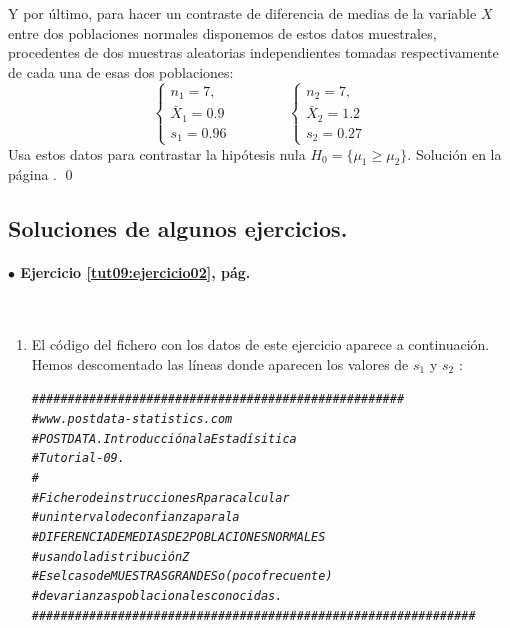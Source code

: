 \documentclass[10pt,a4paper]{article}\usepackage[]{graphicx}\usepackage[]{color}
\makeatletter
\newcommand{\hlcom}[1]{\textcolor[rgb]{0.678,0.584,0.686}{\textit{#1}}}%
\newenvironment{kframe}{%
 \def\at@end@of@kframe{}%
 \ifinner\ifhmode%
  \def\at@end@of@kframe{\end{minipage}}%
  \begin{minipage}{\columnwidth}%
 \fi\fi%
 \def\FrameCommand##1{\hskip\@totalleftmargin \hskip-\fboxsep
 \colorbox{shadecolor}{##1}\hskip-\fboxsep
     \hskip-\linewidth \hskip-\@totalleftmargin \hskip\columnwidth}%
 \MakeFramed {\advance\hsize-\width
   \@totalleftmargin\z@ \linewidth\hsize
   \@setminipage}}%
 {\par\unskip\endMakeFramed%
 \at@end@of@kframe}
\newenvironment{knitrout}{}{} %
\newcounter {cont01}
\makeatother
\begin{document}
{\begin{ejercicio}
\label{tut09:ejercicio09}




Y por último, para hacer un contraste de diferencia de medias de la variable $X$ entre dos poblaciones normales disponemos de estos datos muestrales, procedentes de dos muestras aleatorias independientes tomadas respectivamente de cada una de esas dos poblaciones:
\[
\begin{cases}
n_1 = 7,\\
{\bar X}_1 = 0.9\\
s_1 = 0.96
\end{cases}
\qquad\qquad
\begin{cases}
n_2 = 7,\\
{\bar X}_2 = 1.2\\
s_2 = 0.27
\end{cases}
\]
Usa estos datos para contrastar la hipótesis nula $H_0=\{\mu_1 \geq \mu_2 \}$.
Solución en la página \pageref{tut09:ejercicio09:sol}.
\qed
\end{ejercicio}



\subsection*{Soluciones de algunos ejercicios.}
\label{tut09:subsec:SolucionesAlgunosEjercicios}


\paragraph{\bf $\bullet$ Ejercicio \ref{tut09:ejercicio02}, pág. \pageref{tut09:ejercicio02}}
\label{tut09:ejercicio02:sol}\quad\\

\begin{enumerate}
  \item El código del fichero con los datos de este ejercicio aparece a continuación. Hemos descomentado las líneas donde aparecen los valores de $s_1$ y $s_2$ :

\begin{knitrout}
\color{fgcolor}\begin{kframe}
\begin{alltt}
    \hlcom{####################################################}
    \hlcom{# www.postdata-statistics.com}
    \hlcom{# POSTDATA. Introducción a la Estadísitica}
    \hlcom{# Tutorial-09.}
    \hlcom{#}
    \hlcom{# Fichero de instrucciones R para calcular}
    \hlcom{# un intervalo de confianza para la}
    \hlcom{# DIFERENCIA DE MEDIAS DE 2 POBLACIONES NORMALES}
    \hlcom{# usando la distribución Z}
    \hlcom{# Es el caso de MUESTRAS GRANDES o (poco frecuente)}
    \hlcom{# de varianzas poblacionales conocidas.}
    \hlcom{##############################################################}



\end{alltt}
\end{kframe}
\end{knitrout}
\end{enumerate}}
\end{document}

